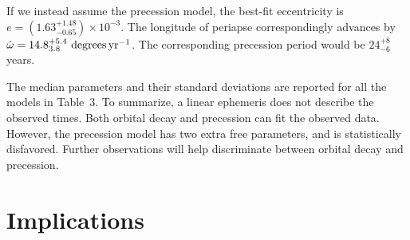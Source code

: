 \documentclass[12pt,twocolumn,tighten]{aastex62}
\begin{document}
If we instead assume the precession model, the best-fit
eccentricity is $e = (1.63^{+ 1.48}_{- 0.65})\times10^{-3}$. The
longitude of periapse correspondingly advances by $\dot{\omega}
= 14.8^{+5.4}_{3.8}\ {\rm degrees}\,{\rm yr}^{-1}$.   The
corresponding precession period would be $24^{+8}_{-6}$ years.

The median parameters and their standard deviations are reported for all
the models in Table~3.  To summarize, a linear ephemeris does not
describe the observed times.  Both orbital decay and precession can fit
the observed data.  However, the precession model has two extra free
parameters, and is statistically disfavored.  Further observations will
help discriminate between orbital decay and precession.

\section{Implications}
\label{sec:implications}
\end{document}
